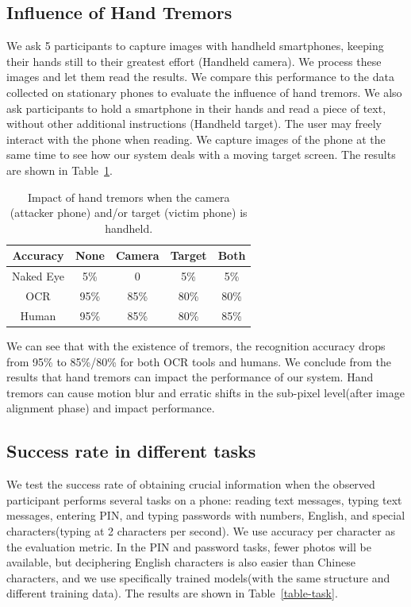 \subsection{Influence of Hand Tremors}
We ask 5 participants to capture images with handheld smartphones, keeping their hands still to their greatest effort (Handheld camera). We process these images and let them read the results. We compare this performance to the data collected on stationary phones to evaluate the influence of hand tremors.
We also ask participants to hold a smartphone in their hands and read a piece of text, without other additional instructions (Handheld target). The user may freely interact with the phone when reading. We capture images of the phone at the same time to see how our system deals with a moving target screen. The results are shown in Table~\ref{table-tremor}.

\begin{table}[!t] 
    \centering
    \caption{Impact of hand tremors when the camera (attacker phone) and/or target (victim phone) is handheld.}
    \begin{tabular}{ccccc}
        \toprule
    Accuracy & None & Camera & Target & Both  \\
    \midrule
    Naked Eye & 5\% & 0 & 5\% & 5\%\\ 
    \midrule
    OCR & 95\% & 85\% & 80\% & 80\%\\ 
    Human & 95\% & 85\% & 80\% & 85\%\\ \bottomrule
    \end{tabular}
    \label{table-tremor}
\end{table}

We can see that with the existence of tremors, the recognition accuracy drops from 95\% to 85\%/80\% for both OCR tools and humans. We conclude from the results that hand tremors can impact the performance of our system. Hand tremors can cause motion blur and erratic shifts in the sub-pixel level(after image alignment phase) and impact performance.


\subsection{Success rate in different tasks}
We test the success rate of obtaining crucial information when the observed participant performs several tasks on a phone: reading text messages, typing text messages, entering PIN, and typing passwords with numbers, English, and special characters(typing at 2 characters per second). We use accuracy per character as the evaluation metric. In the PIN and password tasks, fewer photos will be available, but deciphering English characters is also easier than Chinese characters, and we use specifically trained models(with the same structure and different training data). The results are shown in Table~\ref{table-task}.

